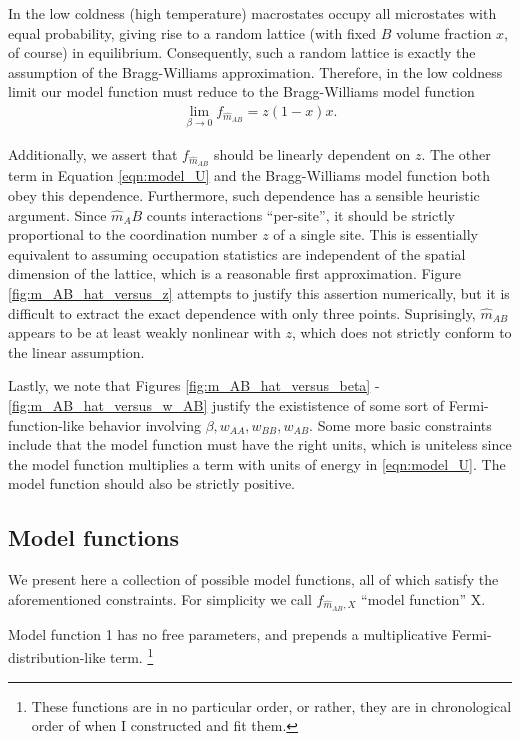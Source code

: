 \documentclass[10pt]{article}
\begin{document}
In the low coldness (high temperature) macrostates occupy all microstates with equal probability, giving rise to a random lattice (with fixed $B$ volume fraction $x$, of course) in equilibrium.
Consequently, such a random lattice is exactly the assumption of the Bragg-Williams approximation.
Therefore, in the low coldness limit our model function must reduce to the Bragg-Williams model function
\begin{align}
    \lim_{\beta \rightarrow 0} f_{\hat{m}_{AB}} = z (1-x) x.
\end{align}

Additionally, we assert that $f_{\hat{m}_{AB}}$ should be linearly dependent on $z$.
The other term in Equation \ref{eqn:model_U} and the Bragg-Williams model function both obey this dependence.
Furthermore, such dependence has a sensible heuristic argument.
Since $\hat{m}_AB$ counts interactions ``per-site'', it should be strictly proportional to the coordination number $z$ of a single site.
This is essentially equivalent to assuming occupation statistics are independent of the spatial dimension of the lattice, which is a reasonable first approximation.
Figure \ref{fig:m_AB_hat_versus_z} attempts to justify this assertion numerically, but it is difficult to extract the exact dependence with only three points.
Suprisingly, $\hat{m}_{AB}$ appears to be at least weakly nonlinear with $z$, which does not strictly conform to the linear assumption.

Lastly, we note that Figures \ref{fig:m_AB_hat_versus_beta} - \ref{fig:m_AB_hat_versus_w_AB} justify the exististence of some sort of Fermi-function-like behavior involving $\beta,w_{AA},w_{BB},w_{AB}$.
Some more basic constraints include that the model function must have the right units, which is uniteless since the model function multiplies a term with units of energy in \ref{eqn:model_U}.
The model function should also be strictly positive.

\subsection{Model functions}
We present here a collection of possible model functions, all of which satisfy the aforementioned constraints.
For simplicity we call $f_{\hat{m}_{AB},X}$ ``model function'' X.

Model function 1 has no free parameters, and prepends a multiplicative Fermi-distribution-like term. \footnote{These functions are in no particular order, or rather, they are in chronological order of when I constructed and fit them.}
\end{document}
